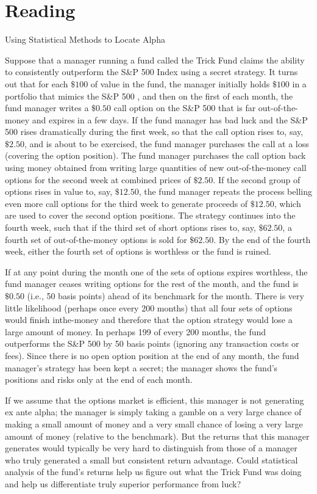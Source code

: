 \documentclass[11pt]{article}
\begin{document}
\section*{Reading}
Using Statistical Methods to Locate Alpha

Suppose that a manager running a fund called the Trick Fund claims the ability to consistently outperform the S\&P 500 Index using a secret strategy. It turns out that for each $\$ 100$ of value in the fund, the manager initially holds $\$ 100$ in a portfolio that mimics the S\&P 500 , and then on the first of each month, the fund manager writes a $\$ 0.50$ call option on the S\&P 500 that is far out-of-the-money and expires in a few days. If the fund manager has bad luck and the S\&P 500 rises dramatically during the first week, so that the call option rises to, say, $\$ 2.50$, and is about to be exercised, the fund manager purchases the call at a loss (covering the option position). The fund manager purchases the call option back using money obtained from writing large quantities of new out-of-the-money call options for the second week at combined prices of $\$ 2.50$. If the second group of options rises in value to, say, $\$ 12.50$, the fund manager repeats the process belling even more call options for the third week to generate proceeds of $\$ 12.50$, which are used to cover the second option positions. The strategy continues into the fourth week, such that if the third set of short options rises to, say, $\$ 62.50$, a fourth set of out-of-the-money options is sold for $\$ 62.50$. By the end of the fourth week, either the fourth set of options is worthless or the fund is ruined.

If at any point during the month one of the sets of options expires worthless, the fund manager ceases writing options for the rest of the month, and the fund is $\$ 0.50$ (i.e., 50 basis points) ahead of its benchmark for the month. There is very little likelihood (perhaps once every 200 months) that all four sets of options would finish inthe-money and therefore that the option strategy would lose a large amount of money. In perhaps 199 of every 200 months, the fund outperforms the S\&P 500 by 50 basis points (ignoring any transaction costs or fees). Since there is no open option position at the end of any month, the fund manager's strategy has been kept a secret; the manager shows the fund's positions and risks only at the end of each month.

If we assume that the options market is efficient, this manager is not generating ex ante alpha; the manager is simply taking a gamble on a very large chance of making a small amount of money and a very small chance of losing a very large amount of money (relative to the benchmark). But the returns that this manager generates would typically be very hard to distinguish from those of a manager who truly generated a small but consistent return advantage. Could statistical analysis of the fund's returns help us figure out what the Trick Fund was doing and help us differentiate truly superior performance from luck?
\end{document}

